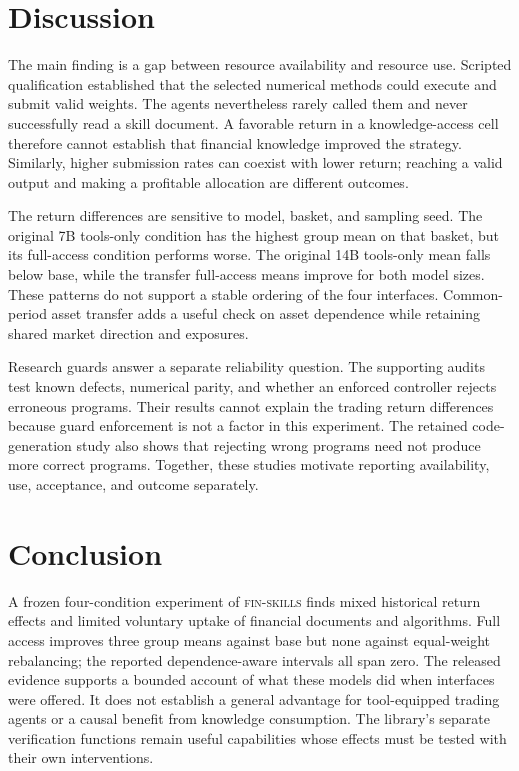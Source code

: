 \documentclass[11pt]{article}
\begin{document}


\section{Discussion}
The main finding is a gap between resource availability and resource use. Scripted
qualification established that the selected numerical methods could execute and submit
valid weights. The agents nevertheless rarely called them and never successfully read a
skill document. A favorable return in a knowledge-access cell therefore cannot establish
that financial knowledge improved the strategy. Similarly, higher submission rates can
coexist with lower return; reaching a valid output and making a profitable allocation are
different outcomes.

The return differences are sensitive to model, basket, and sampling seed. The original
7B tools-only condition has the highest group mean on that basket, but its full-access
condition performs worse. The original 14B tools-only mean falls below base, while the
transfer full-access means improve for both model sizes. These patterns do not support a
stable ordering of the four interfaces. Common-period asset transfer adds a useful check
on asset dependence while retaining shared market direction and exposures.

Research guards answer a separate reliability question. The supporting audits test
known defects, numerical parity, and whether an enforced controller rejects erroneous
programs. Their results cannot explain the trading return differences because guard
enforcement is not a factor in this experiment. The retained code-generation study also
shows that rejecting wrong programs need not produce more correct programs. Together,
these studies motivate reporting availability, use, acceptance, and outcome separately.

\section{Conclusion}
A frozen four-condition experiment of \textsc{fin-skills} finds mixed historical return
effects and limited voluntary uptake of financial documents and algorithms. Full access
improves three group means against base but none against equal-weight rebalancing; the
reported dependence-aware intervals all span zero. The released evidence supports a
bounded account of what these models did when interfaces were offered. It does not
establish a general advantage for tool-equipped trading agents or a causal benefit from
knowledge consumption. The library's separate verification functions remain useful
capabilities whose effects must be tested with their own interventions.
\end{document}
